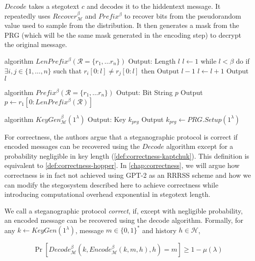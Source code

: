 $Decode$ takes a stegotext $c$ and decodes it to the hiddentext message.
It repeatedly uses $Recover_{\mathcal{M}}^\beta$ and $Prefix^\beta$ to recover bits from the pseudorandom value used to sample from the distribution.
It then generates a mask from the PRG (which will be the same mask generated in the encoding step) to decrypt the original message.

\begin{Pseudocode}[caption={Meteor LenPrefix Algorithm, \cite{Meteor2021}}]
algorithm $LenPrefix^\beta(\mathcal R = \{ r_1, \dots r_n \})$
	Output: Length $l$
	$l \leftarrow 1$
	while $l < \beta$ do
		if $\exists i, j \in \{ 1, \dots, n \}$ such that $r_i[0: l] \neq r_j[0:	l]$ then
			Output $l-1$
		$l \leftarrow l+1$
	Output $l$
\end{Pseudocode}%
%
\begin{Pseudocode}[caption={Meteor Prefix Algorithm, \cite{Meteor2021}}]
algorithm $Prefix^\beta(	\mathcal R = \{ r_1, \dots r_n \})$
	Output: Bit String $p$
	Output $p \leftarrow r_1[0: LenPrefix^\beta(\mathcal{R})]$
\end{Pseudocode}%
%
\begin{Pseudocode}[caption={Meteor KeyGen Algorithm, \cite{Meteor2021}}]
algorithm $KeyGen_{\mathcal{M}}^\beta(1^\lambda)$
	Output: Key $k_{prg}$
	Output $k_{prg} \leftarrow PRG.Setup(1^\lambda)$
\end{Pseudocode}

For correctness, the authors argue that a steganographic protocol is correct if encoded messages can be recovered using the $Decode$ algorithm except for a probability negligible in key length (\autoref{def:correctness-kaptchuk}). This definition is equivalent to \autoref{def:correctness-hopper}. 
In \autoref{chap:correctness}, we will argue how correctness is in fact not achieved using GPT-2 as an RRRSS scheme and how we can modify the stegosystem described here to achieve correctness while introducing computational overhead exponential in stegotext length.

\begin{definition}
\label{def:correctness-kaptchuk}
We call a steganographic protocol \emph{correct}, if, except with negligible probability, an encoded message can be recovered using the decode algorithm.
Formally, for any $k \leftarrow KeyGen(1^\lambda)$, message $m \in \{0,1\}^*$ and history $h \in \mathcal{H}$,

$$\mathop{Pr}[Decode_{\mathcal{M}}^\beta(k, Encode_{\mathcal{M}}^\beta(k, m, h), h) = m] \geq 1 - \mu(\lambda)$$
\end{definition}

